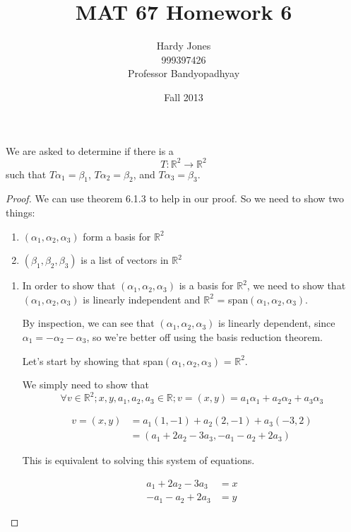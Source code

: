 \documentclass[12pt,letterpaper]{article}
\title{MAT 67 Homework 6\vspace{-2ex}}
\author{Hardy Jones\\
        999397426\\
        Professor Bandyopadhyay\vspace{-2ex}}
\date{Fall 2013}
\begin{document}
  \maketitle

  We are asked to determine if there is a
  \[T: \mathbb{R}^2 \rightarrow \mathbb{R}^2\]
  such that $T\alpha_1 = \beta_1$, $T\alpha_2 = \beta_2$, and $T\alpha_3 = \beta_3$.

  \begin{proof}
    We can use theorem 6.1.3 to help in our proof.
    So we need to show two things:

    \begin{enumerate}
      \item $(\alpha_1, \alpha_2, \alpha_3)$ form a basis for $\mathbb{R}^2$
      \item $(\beta_1, \beta_2, \beta_3)$ is a list of vectors in $\mathbb{R}^2$
    \end{enumerate}

    \begin{enumerate}
      \item
        In order to show that $(\alpha_1, \alpha_2, \alpha_3)$ is a basis for $\mathbb{R}^2$,
        we need to show that $(\alpha_1, \alpha_2, \alpha_3)$ is linearly independent
        and $\mathbb{R}^2$ = span$(\alpha_1, \alpha_2, \alpha_3)$.

        By inspection, we can see that $(\alpha_1, \alpha_2, \alpha_3)$ is linearly dependent,
        since $\alpha_1 = -\alpha_2 - \alpha_3$, so we're better off using the basis reduction theorem.

        Let's start by showing that span$(\alpha_1, \alpha_2, \alpha_3)$ = $\mathbb{R}^2$.

        We simply need to show that
        \[\forall v \in \mathbb{R}^2; x, y, a_1, a_2, a_3 \in \mathbb{R}; v = (x, y) = a_1\alpha_1 + a_2\alpha_2 + a_3\alpha_3\]

        \begin{align*}
          v = (x, y) &= a_1(1, -1) + a_2(2, -1) + a_3(-3, 2) \\
          &= (a_1 + 2a_2 -3a_3, -a_1 - a_2 + 2a_3)
        \end{align*}

        This is equivalent to solving this system of equations.

        \begin{align*}
          a_1 + 2a_2 - 3a_3 & = x \\
          -a_1 - a_2 + 2a_3 & = y
        \end{align*}


\end{enumerate}
\end{proof}
\end{document}

